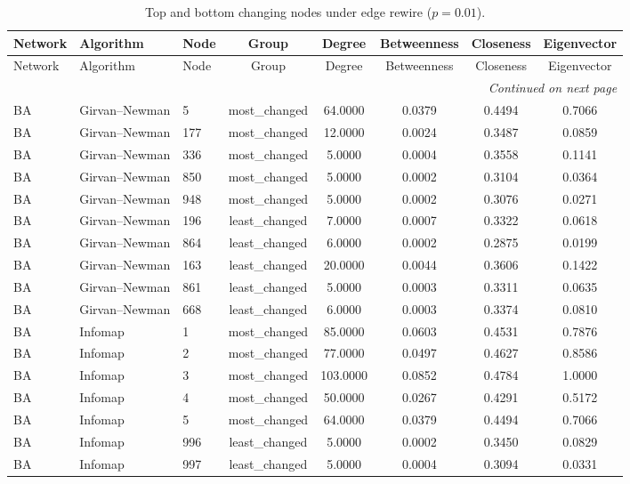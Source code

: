 \begin{longtable}{lllccccc}
\caption{Top and bottom changing nodes under edge rewire ($p=0.01$).}\label{tab:node_rewire_p001}\\
\toprule
Network & Algorithm & Node & Group & Degree & Betweenness & Closeness & Eigenvector \\
\midrule
\endfirsthead
\toprule
Network & Algorithm & Node & Group & Degree & Betweenness & Closeness & Eigenvector \\
\midrule
\endhead
\midrule
\multicolumn{8}{r}{\emph{Continued on next page}} \\
\endfoot
\bottomrule
\endlastfoot
BA & Girvan--Newman & 5 & most\_changed & 64.0000 & 0.0379 & 0.4494 & 0.7066 \\
BA & Girvan--Newman & 177 & most\_changed & 12.0000 & 0.0024 & 0.3487 & 0.0859 \\
BA & Girvan--Newman & 336 & most\_changed & 5.0000 & 0.0004 & 0.3558 & 0.1141 \\
BA & Girvan--Newman & 850 & most\_changed & 5.0000 & 0.0002 & 0.3104 & 0.0364 \\
BA & Girvan--Newman & 948 & most\_changed & 5.0000 & 0.0002 & 0.3076 & 0.0271 \\
BA & Girvan--Newman & 196 & least\_changed & 7.0000 & 0.0007 & 0.3322 & 0.0618 \\
BA & Girvan--Newman & 864 & least\_changed & 6.0000 & 0.0002 & 0.2875 & 0.0199 \\
BA & Girvan--Newman & 163 & least\_changed & 20.0000 & 0.0044 & 0.3606 & 0.1422 \\
BA & Girvan--Newman & 861 & least\_changed & 5.0000 & 0.0003 & 0.3311 & 0.0635 \\
BA & Girvan--Newman & 668 & least\_changed & 6.0000 & 0.0003 & 0.3374 & 0.0810 \\
BA & Infomap & 1 & most\_changed & 85.0000 & 0.0603 & 0.4531 & 0.7876 \\
BA & Infomap & 2 & most\_changed & 77.0000 & 0.0497 & 0.4627 & 0.8586 \\
BA & Infomap & 3 & most\_changed & 103.0000 & 0.0852 & 0.4784 & 1.0000 \\
BA & Infomap & 4 & most\_changed & 50.0000 & 0.0267 & 0.4291 & 0.5172 \\
BA & Infomap & 5 & most\_changed & 64.0000 & 0.0379 & 0.4494 & 0.7066 \\
BA & Infomap & 996 & least\_changed & 5.0000 & 0.0002 & 0.3450 & 0.0829 \\
BA & Infomap & 997 & least\_changed & 5.0000 & 0.0004 & 0.3094 & 0.0331 \\

\end{longtable}
